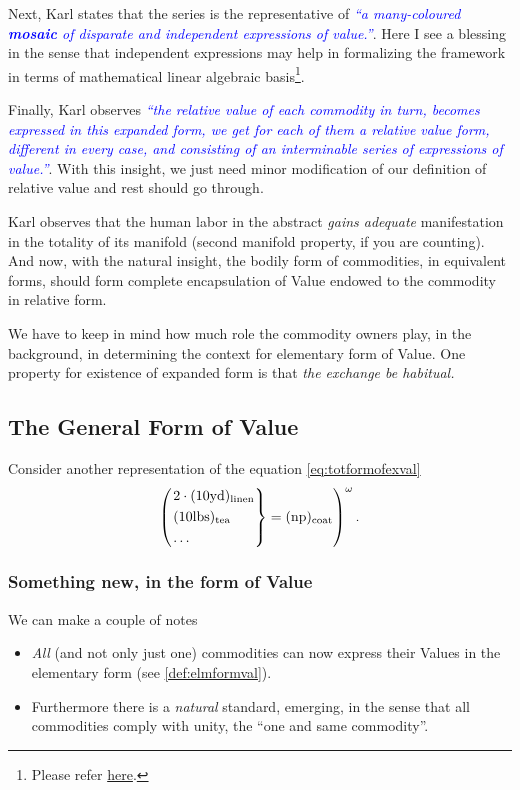 \documentclass[12pt]{extarticle}
\theoremstyle{definition}
\begin{document}
Next, Karl states that the series is the representative of \emph{\textcolor{blue}{``a many-coloured \textbf{mosaic} of disparate and independent expressions of value.''}}.  Here I see a blessing in the sense that independent expressions may help in formalizing the framework in terms of mathematical linear algebraic basis\footnote{Please refer \href{https://en.wikipedia.org/wiki/Basis\_(linear\_algebra)}{here}.}.

Finally, Karl observes \emph{\textcolor{blue}{``the relative value of each commodity in turn, becomes expressed in this expanded form, we get for each of them a relative value form, different in every case, and consisting of an interminable series of expressions of value.''}}.  With this insight, we just need minor modification of our definition of relative value and rest should go through.

Karl observes that the human labor in the abstract \emph{gains adequate} manifestation in the totality of its manifold (second manifold property, if you are counting).  And now, with the natural insight, the bodily form of commodities, in equivalent forms, should form complete encapsulation of Value endowed to the commodity in relative form.

We have to keep in mind how much role the commodity owners play, in the background, in determining the context for elementary form of Value.  One property for existence of expanded form is that \emph{the exchange be habitual.}

\subsection{The General Form of Value}
Consider another representation of the equation \ref{eq:totformofexval}
\begin{equation}
  \label{eq:genformval}
 \left(
   \begin{rcases*} 
    2\cdot (10\text{yd})_{\text{linen}}\\
     (10\text{lbs})_{\text{tea}}\\
      \ldots
   \end{rcases*} = (\text{np})_{\text{coat}}\right)^\omega.
 \end{equation}
 \subsubsection{Something new, in the form of Value}
 We can make a couple of notes
 \begin{itemize}
 \item \emph{All} (and not only just one) commodities can now express their Values in the elementary form (see \ref{def:elmformval}).  
   \item Furthermore there is a \emph{natural} standard, emerging, in the sense that all commodities comply with unity, the ``one and same commodity''.
 \end{itemize}
\end{document}
